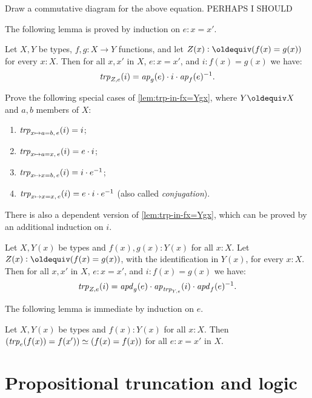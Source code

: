 \begin{xca}\label{xca:conjugation}
Draw a commutative diagram for the above equation. PERHAPS I SHOULD
\end{xca}

The following lemma is proved by induction on $e: x=x'$.

\begin{lemma}\label{lem:trp-in-fx=Ygx}
Let $X,Y$ be types, $f,g: X\to Y$ functions, and let
$Z(x)\defeq (f(x)=g(x))$ for every $x:X$. 
Then for all $x,x'$ in $X$, $e: x=x'$, and $i: f(x)=g(x)$ we have:
\[
\mathord{\mathit{trp}}_{Z, e} (i) = \mathop{{\it ap}_{g}}(e) \cdot i \cdot \mathop{{\it ap}_{f}}(e)^{-1}.
\]
\end{lemma}

\begin{xca}\label{xca:trp-in-a/x=b/x}
Prove the following special cases of \cref{lem:trp-in-fx=Ygx},
where $Y\jdeq X$ and $a,b$ members of $X$:
\begin{enumerate}
\item $\mathord{\mathit{trp}}_{x\mapsto a=b,\,e} (i) = i$;
\item\label{xca-trp-in-a=x} $\mathord{\mathit{trp}}_{x\mapsto a=x,\,e} (i) = e\cdot i$;
\item $\mathord{\mathit{trp}}_{x\mapsto x=b,\,e} (i) = i \cdot e^{-1}$;
\item $\mathord{\mathit{trp}}_{x\mapsto x=x,\,e} (i) = e \cdot i\cdot e^{-1}$ 
(also called \emph{conjugation}).
\end{enumerate}
\end{xca}

There is also a dependent version of \cref{lem:trp-in-fx=Ygx},
which can be proved by an additional induction on $i$.

\begin{lemma}\label{lem:trp-in-fx=Yxgx}
Let $X,Y(x)$ be types and $f(x),g(x): Y(x)$ for all $x:X$. 
Let $Z(x)\defeq (f(x)=g(x))$,
with the identification in $Y(x)$, for every $x:X$. 
Then for all $x,x'$ in $X$, $e: x=x'$, and $i: f(x)=g(x)$ we have:
\[
\mathord{\mathit{trp}}_{Z, e} (i) = \mathop{{\it apd}_{g}}(e) \cdot \mathop{{\it ap}_{\mathord{\mathit{trp}}_{Y,e}}}(i) \cdot \mathop{{\it apd}_{f}}(e)^{-1}.
\]
\end{lemma}

The following lemma is immediate by induction on $e$.

\begin{lemma}\label{lem:Dan's-lemma}
Let $X,Y(x)$ be types and $f(x): Y(x)$ for all $x:X$.
Then $(\mathord{\mathit{trp}}_e(f(x))=f(x')) \simeq (f(x)=f(x))$ for all $e: x=x'$ in $X$.
\end{lemma}


\section{Propositional truncation and logic}
\label{sec:prop-trunc}

